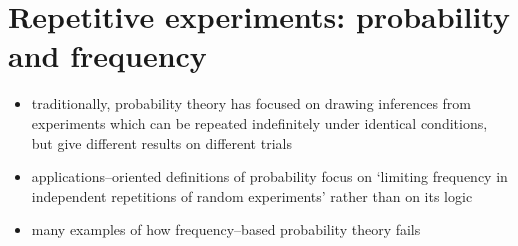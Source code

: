 \documentclass[../jaynes_prob_theory_notes.tex]{subfiles}
\begin{document}
    \section{Repetitive experiments: probability and frequency}
        \begin{itemize}
            \item traditionally, probability theory has focused on drawing inferences from experiments which can be repeated indefinitely under identical conditions, but give different results on different trials
            \item applications--oriented definitions of probability focus on `limiting frequency in independent repetitions of random experiments' rather than on its logic
            \item many examples of how frequency--based probability theory fails
        \end{itemize}
        
\end{document}
